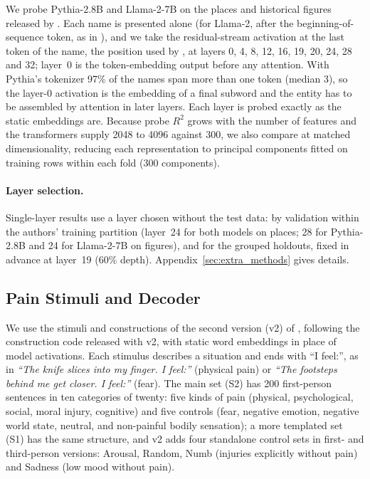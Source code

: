 \documentclass[11pt]{article}
\begin{document}
We probe Pythia-2.8B \citep{biderman2023pythia} and Llama-2-7B \citep{touvron2023llama} on the places and historical figures released by \citet{gurnee2024language}. Each name is presented alone (for Llama-2, after the beginning-of-sequence
token, as in \citet{gurnee2024language}), and we take the residual-stream activation at the last token of the name,
the position used by \citet{gurnee2024language}, at layers 0, 4, 8, 12, 16, 19, 20, 24, 28 and 32; layer~0 is the
token-embedding output before any attention. With Pythia's tokenizer 97\% of the names span
more than one token (median 3), so the layer-0 activation is the embedding of a final
subword and the entity has to be assembled by attention in later layers. Each layer is
probed exactly as the static embeddings are. Because probe $R^2$ grows with the number of
features and the transformers supply 2048 to 4096 against 300, we also compare at matched
dimensionality, reducing each representation to principal components fitted on training rows
within each fold (300 components).

\paragraph{Layer selection.} Single-layer results use a layer chosen without the test
data: by validation within the authors' training partition (layer~24 for both models on places; 28 for Pythia-2.8B and 24 for Llama-2-7B on figures), and for the grouped holdouts,
fixed in advance at layer~19 (60\% depth). Appendix~\ref{sec:extra_methods} gives details.

\subsection{Pain Stimuli and Decoder}
\label{sec:pain_methods}

We use the stimuli and constructions of the second version (v2) of \citet{tagliabue2026pain}, following the construction code released with v2, with static word embeddings in place of model activations. Each stimulus describes a situation and ends with ``I feel:'', as in \emph{``The knife slices into my finger. I feel:''} (physical pain) or \emph{``The footsteps behind me get closer. I feel:''} (fear). The main set (S2) has 200 first-person sentences in ten categories of twenty: five kinds of pain (physical, psychological, social, moral injury, cognitive) and five controls (fear, negative emotion, negative world state, neutral, and non-painful bodily sensation); a more templated set (S1) has the same structure, and v2 adds four standalone control sets in first- and third-person versions: Arousal, Random, Numb (injuries explicitly without pain) and Sadness (low mood without pain).
\end{document}
